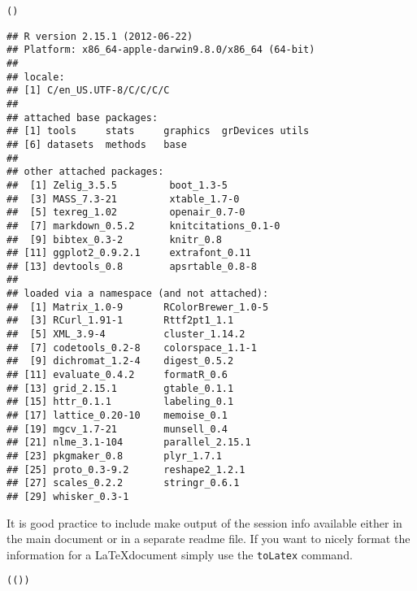 \begin{knitrout}
\color{fgcolor}\begin{kframe}
\begin{alltt}
()
\end{alltt}
\begin{verbatim}
## R version 2.15.1 (2012-06-22)
## Platform: x86_64-apple-darwin9.8.0/x86_64 (64-bit)
## 
## locale:
## [1] C/en_US.UTF-8/C/C/C/C
## 
## attached base packages:
## [1] tools     stats     graphics  grDevices utils    
## [6] datasets  methods   base     
## 
## other attached packages:
##  [1] Zelig_3.5.5         boot_1.3-5         
##  [3] MASS_7.3-21         xtable_1.7-0       
##  [5] texreg_1.02         openair_0.7-0      
##  [7] markdown_0.5.2      knitcitations_0.1-0
##  [9] bibtex_0.3-2        knitr_0.8          
## [11] ggplot2_0.9.2.1     extrafont_0.11     
## [13] devtools_0.8        apsrtable_0.8-8    
## 
## loaded via a namespace (and not attached):
##  [1] Matrix_1.0-9       RColorBrewer_1.0-5
##  [3] RCurl_1.91-1       Rttf2pt1_1.1      
##  [5] XML_3.9-4          cluster_1.14.2    
##  [7] codetools_0.2-8    colorspace_1.1-1  
##  [9] dichromat_1.2-4    digest_0.5.2      
## [11] evaluate_0.4.2     formatR_0.6       
## [13] grid_2.15.1        gtable_0.1.1      
## [15] httr_0.1.1         labeling_0.1      
## [17] lattice_0.20-10    memoise_0.1       
## [19] mgcv_1.7-21        munsell_0.4       
## [21] nlme_3.1-104       parallel_2.15.1   
## [23] pkgmaker_0.8       plyr_1.7.1        
## [25] proto_0.3-9.2      reshape2_1.2.1    
## [27] scales_0.2.2       stringr_0.6.1     
## [29] whisker_0.3-1
\end{verbatim}
\end{kframe}
\end{knitrout}


\noindent It is good practice to include make output of the session info available either in the main document or in a separate readme file. If you want to nicely format the information for a \LaTeX document simply use the {\tt{toLatex}} command.

\begin{knitrout}
\color{fgcolor}\begin{kframe}
\begin{alltt}
(())
\end{alltt}
\end{kframe}
\end{knitrout}


